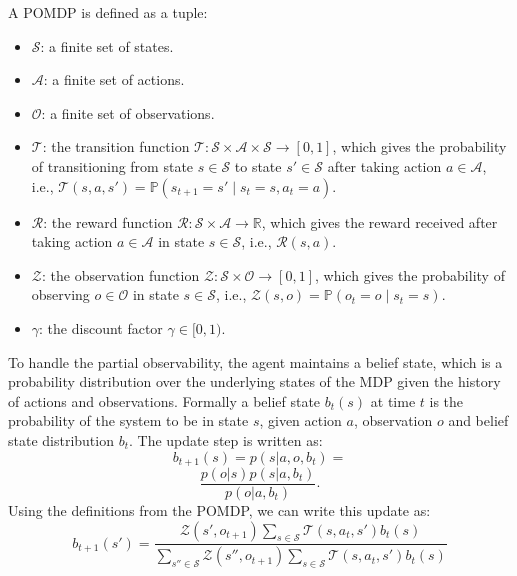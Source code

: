 A POMDP is defined as a tuple:

\begin{itemize}
\item $\mathcal{S}$: a finite set of states.
\item $\mathcal{A}$: a finite set of actions.
\item $\mathcal{O}$: a finite set of observations.
\item $\mathcal{T}$: the transition function $\mathcal{T}: \mathcal{S} \times \mathcal{A} \times \mathcal{S} \rightarrow [0, 1]$, which gives the probability of transitioning from state $s \in \mathcal{S}$ to state $s' \in \mathcal{S}$ after taking action $a \in \mathcal{A}$, i.e., $\mathcal{T}(s, a, s') = \mathbb{P}(s_{t+1} = s' \mid s_t = s, a_t = a)$.
\item $\mathcal{R}$: the reward function $\mathcal{R}: \mathcal{S} \times \mathcal{A} \rightarrow \mathbb{R}$, which gives the reward received after taking action $a \in \mathcal{A}$ in state $s \in \mathcal{S}$, i.e., $\mathcal{R}(s, a)$.
\item $\mathcal{Z}$: the observation function $\mathcal{Z}: \mathcal{S} \times \mathcal{O} \rightarrow [0, 1]$, which gives the probability of observing $o \in \mathcal{O}$ in state $s \in \mathcal{S}$, i.e., $\mathcal{Z}(s, o) = \mathbb{P}(o_{t} = o \mid s_t = s)$.
\item $\gamma$: the discount factor $\gamma \in [0, 1)$.
\end{itemize}

To handle the partial observability, the agent maintains a belief state, which is a probability distribution over the underlying states of the MDP given the history of 
actions and observations. Formally a belief state $b_t(s)$ at time $t$ is the probability of the system to be in state $s$, 
given action $a$, observation $o$ and belief state distribution $b_{t}$. The update step is written as:
\begin{equation*}
    b_{t+1}(s) = p(s|a,o,b_{t}) = 
\end{equation*}
\begin{equation*}
    \frac{p(o|s) p(s|a,b_{t})}{p(o|a,b_{t})}.
\end{equation*}
Using the definitions from the POMDP, we can write this update as:
\begin{equation}
    \label{pomdp_bayes}
b_{t+1}(s') = \frac{\mathcal{Z}(s', o_{t+1}) \sum_{s \in \mathcal{S}} \mathcal{T}(s, a_t, s') b_t(s)}{\sum_{s'' \in \mathcal{S}} \mathcal{Z}(s'', o_{t+1}) \sum_{s \in \mathcal{S}} \mathcal{T}(s, a_t, s') b_t(s)}
\end{equation}

